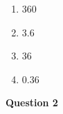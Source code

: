 \begin{enumerate}[label=(\roman*)]
        \begin{multicols}{4}
        \begin{enumerate}[label=(\alph*)]
            \item 360
            \item 3.6
            \item 36
            \item 0.36
        \end{enumerate}
        \end{multicols}

\end{enumerate}

\newpage
\par
\noindent
\textbf{Question 2}\\
